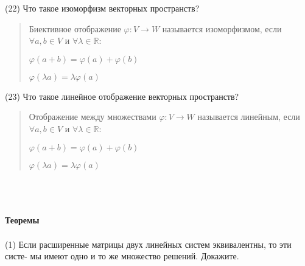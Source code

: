 \documentclass{article}
\begin{document}
(22) Что такое изоморфизм векторных пространств? 
\begin{quote}
Биективное отображение $\varphi: V \rightarrow W$ называется изоморфизмом, если $\forall a, b \in V$ и $\forall \lambda \in \mathbb{R}$:

$
\varphi(a + b) = \varphi(a) + \varphi(b) 
$

$
\varphi(\lambda a) = \lambda \varphi(a)
$
\end{quote}
(23) Что такое линейное отображение векторных пространств?
\begin{quote}
    Отображение между множествами $\varphi: V \rightarrow W$ называется линейным, если $\forall a, b \in V$ и $\forall \lambda \in \mathbb{R}$:

$
\varphi(a + b) = \varphi(a) + \varphi(b) 
$

$
\varphi(\lambda a) = \lambda \varphi(a)
$
    
\end{quote}
\\
\\
\\
\large\textsf{\textbf{Теоремы}}
\\
\\
(1) Если расширенные матрицы двух линейных систем эквивалентны, то эти систе- мы имеют одно и то же множество решений. Докажите. 
\end{document}
